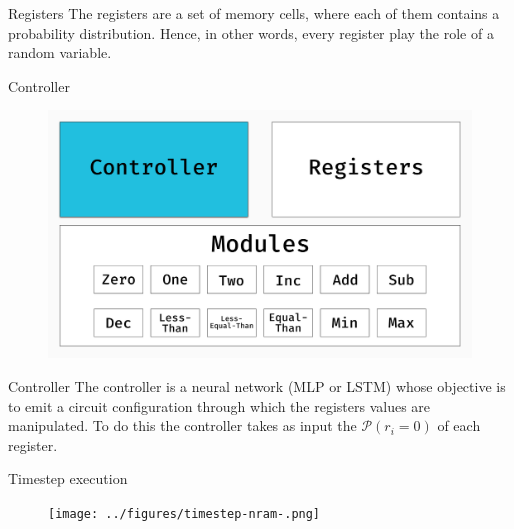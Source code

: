 \documentclass{beamer}
\begin{document}
  \begin{frame}{Registers}
  	The registers are a set of memory cells, where each of them contains a probability distribution. Hence, in other words, every register play the role of a random variable.
  \end{frame}
  \begin{frame}{Controller}
  	\begin{figure}
  		\centering
  		\includegraphics[width=\textwidth]{../figures/schema-nram-without-memory-CL.png}
  	\end{figure}
  \end{frame}
  \begin{frame}{Controller}
  	The controller is a neural network (MLP or LSTM) whose objective is to emit a circuit configuration through which the registers values are manipulated. To do this the controller takes as input the $\mathcal{P}(r_{i} = 0)$ of each register.
  \end{frame}

  \begin{frame}{Timestep execution}  
	\begin{figure}
  		\centering
  		\texttt{[image: ../figures/timestep-nram-.png]}
  	\end{figure}
  \end{frame}  
  
\end{document}
